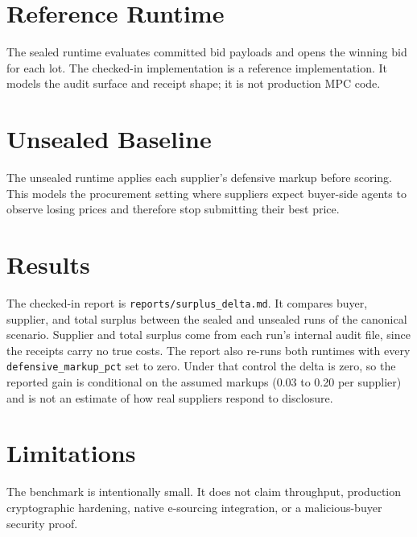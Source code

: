 \documentclass[11pt]{article}
\begin{document}
\section{Reference Runtime}

The sealed runtime evaluates committed bid payloads and opens the winning bid
for each lot. The checked-in implementation is a reference implementation. It
models the audit surface and receipt shape; it is not production MPC code.

\section{Unsealed Baseline}

The unsealed runtime applies each supplier's defensive markup before scoring.
This models the procurement setting where suppliers expect buyer-side agents to
observe losing prices and therefore stop submitting their best price.

\section{Results}

The checked-in report is \texttt{reports/surplus\_delta.md}. It compares buyer,
supplier, and total surplus between the sealed and unsealed runs of the canonical
scenario. Supplier and total surplus come from each run's internal audit file,
since the receipts carry no true costs. The report also re-runs both runtimes
with every \texttt{defensive\_markup\_pct} set to zero. Under that control the
delta is zero, so the reported gain is conditional on the assumed markups (0.03
to 0.20 per supplier) and is not an estimate of how real suppliers respond to
disclosure.

\section{Limitations}

The benchmark is intentionally small. It does not claim throughput, production
cryptographic hardening, native e-sourcing integration, or a malicious-buyer
security proof.



\end{document}
